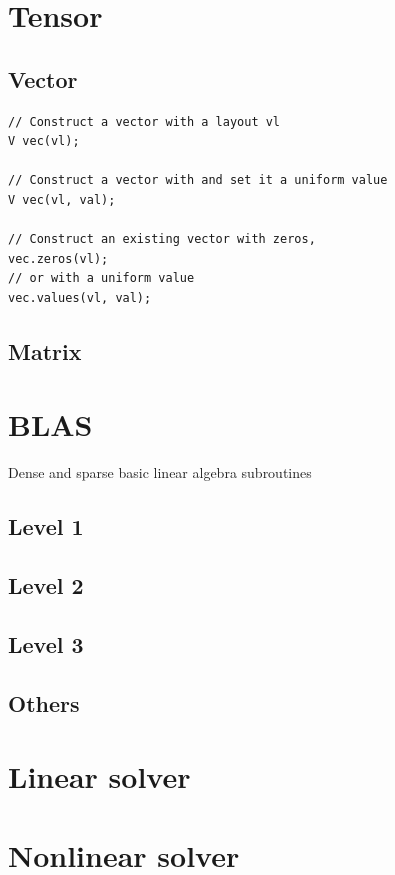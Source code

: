 \documentclass[a4paper,landscape,columns=3]{cheatsheet} %
\begin{document}
\section{Tensor}
\subsection{Vector}
\begin{lstlisting}
// Construct a vector with a layout vl
V vec(vl);

// Construct a vector with and set it a uniform value
V vec(vl, val);

// Construct an existing vector with zeros,
vec.zeros(vl);
// or with a uniform value
vec.values(vl, val);

\end{lstlisting}
\subsection{Matrix}

\section{BLAS}
Dense and sparse basic linear algebra subroutines
\subsection{Level 1}

\subsection{Level 2}

\subsection{Level 3}

\subsection{Others}


\section{Linear solver}


\section{Nonlinear solver}
\end{document}

